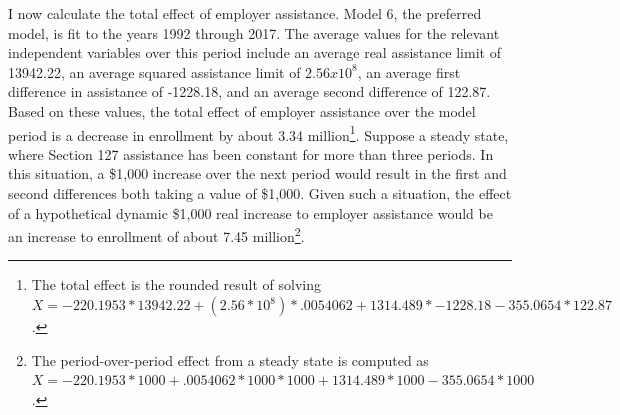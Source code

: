 \documentclass[review]{elsarticle}
\begin{document}
I now calculate the total effect of employer assistance.
Model 6, the preferred model, is fit to the years 1992 through 2017.
The average values for the relevant independent variables over this period include
an average real assistance limit of 13942.22,
an average squared assistance limit of $2.56x10^8$,
an average first difference in assistance of -1228.18,
and an average second difference of 122.87.
Based on these values, the total effect of employer assistance over the model period is
a decrease in enrollment by about 3.34 million\footnote{
    The total effect is the rounded result of solving $X=-220.1953*13942.22+(2.56*10^8)*.0054062+1314.489*-1228.18-355.0654*122.87$.
}.
Suppose a steady state, where Section 127 assistance has been constant for more than three periods.
In this situation, a \$1,000 increase over the next period would result in
the first and second differences both taking a value of \$1,000.
Given such a situation,
the effect of a hypothetical dynamic \$1,000 real increase to employer assistance would be
an increase to enrollment of about 7.45 million\footnote{
    The period-over-period effect from a steady state is computed as $X=-220.1953*1000+.0054062*1000*1000+1314.489*1000-355.0654*1000$.
}.

\end{document}
